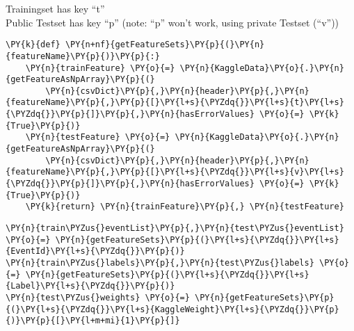     Trainingset has key ``t''\\
Public Testset has key ``p'' (note: ``p'' won't work, using private
Testset (``v''))


{\par%
\vspace{-1\baselineskip}%
}%
\begin{notebookcell}[]%
\begin{addmargin}[\cellleftmargin]{0em}%
{\smaller%
\par%
%
\vspace{-1\smallerfontscale}%
\begin{Verbatim}[commandchars=\\\{\}]
\PY{k}{def} \PY{n+nf}{getFeatureSets}\PY{p}{(}\PY{n}{featureName}\PY{p}{)}\PY{p}{:}
    \PY{n}{trainFeature} \PY{o}{=} \PY{n}{KaggleData}\PY{o}{.}\PY{n}{getFeatureAsNpArray}\PY{p}{(}
        \PY{n}{csvDict}\PY{p}{,}\PY{n}{header}\PY{p}{,}\PY{n}{featureName}\PY{p}{,}\PY{p}{[}\PY{l+s}{\PYZdq{}}\PY{l+s}{t}\PY{l+s}{\PYZdq{}}\PY{p}{]}\PY{p}{,}\PY{n}{hasErrorValues} \PY{o}{=} \PY{k}{True}\PY{p}{)}
    \PY{n}{testFeature} \PY{o}{=} \PY{n}{KaggleData}\PY{o}{.}\PY{n}{getFeatureAsNpArray}\PY{p}{(}
        \PY{n}{csvDict}\PY{p}{,}\PY{n}{header}\PY{p}{,}\PY{n}{featureName}\PY{p}{,}\PY{p}{[}\PY{l+s}{\PYZdq{}}\PY{l+s}{v}\PY{l+s}{\PYZdq{}}\PY{p}{]}\PY{p}{,}\PY{n}{hasErrorValues} \PY{o}{=} \PY{k}{True}\PY{p}{)}
    \PY{k}{return} \PY{n}{trainFeature}\PY{p}{,} \PY{n}{testFeature}
\end{Verbatim}
%
\par%
\vspace{-1\smallerfontscale}}%
\end{addmargin}
\end{notebookcell}



{\par%
\vspace{-1\baselineskip}%
}%
\begin{notebookcell}[]%
\begin{addmargin}[\cellleftmargin]{0em}%
{\smaller%
\par%
%
\vspace{-1\smallerfontscale}%
\begin{Verbatim}[commandchars=\\\{\}]
\PY{n}{train\PYZus{}eventList}\PY{p}{,}\PY{n}{test\PYZus{}eventList} \PY{o}{=} \PY{n}{getFeatureSets}\PY{p}{(}\PY{l+s}{\PYZdq{}}\PY{l+s}{EventId}\PY{l+s}{\PYZdq{}}\PY{p}{)}
\PY{n}{train\PYZus{}labels}\PY{p}{,}\PY{n}{test\PYZus{}labels} \PY{o}{=} \PY{n}{getFeatureSets}\PY{p}{(}\PY{l+s}{\PYZdq{}}\PY{l+s}{Label}\PY{l+s}{\PYZdq{}}\PY{p}{)}
\PY{n}{test\PYZus{}weights} \PY{o}{=} \PY{n}{getFeatureSets}\PY{p}{(}\PY{l+s}{\PYZdq{}}\PY{l+s}{KaggleWeight}\PY{l+s}{\PYZdq{}}\PY{p}{)}\PY{p}{[}\PY{l+m+mi}{1}\PY{p}{]}
\end{Verbatim}
%
\par%
\vspace{-1\smallerfontscale}}%
\end{addmargin}
\end{notebookcell}


